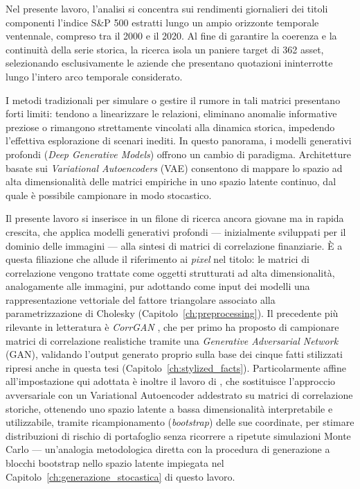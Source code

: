 Nel presente lavoro, l'analisi si concentra sui rendimenti giornalieri dei titoli componenti l'indice S\&P 500 estratti lungo un ampio orizzonte temporale ventennale, compreso tra il 2000 e il 2020. Al fine di garantire la coerenza e la continuità della serie storica, la ricerca isola un paniere target di 362 asset, selezionando esclusivamente le aziende che presentano quotazioni ininterrotte lungo l'intero arco temporale considerato.

I metodi tradizionali per simulare o gestire il rumore in tali matrici presentano forti limiti: tendono a linearizzare le relazioni, eliminano anomalie informative preziose o rimangono strettamente vincolati alla dinamica storica, impedendo l'effettiva esplorazione di scenari inediti. In questo panorama, i modelli generativi profondi (\emph{Deep Generative Models}) offrono un cambio di paradigma. Architetture basate sui \emph{Variational Autoencoders} (VAE) \citep{kingma2013vae} consentono di mappare lo spazio ad alta dimensionalità delle matrici empiriche in uno spazio latente continuo, dal quale è possibile campionare in modo stocastico.

Il presente lavoro si inserisce in un filone di ricerca ancora giovane ma in rapida crescita, che applica modelli generativi profondi --- inizialmente sviluppati per il dominio delle immagini --- alla sintesi di matrici di correlazione finanziarie. È a questa filiazione che allude il riferimento ai \emph{pixel} nel titolo: le matrici di correlazione vengono trattate come oggetti strutturati ad alta dimensionalità, analogamente alle immagini, pur adottando come input dei modelli una rappresentazione vettoriale del fattore triangolare associato alla parametrizzazione di Cholesky (Capitolo~\ref{ch:preprocessing}). Il precedente più rilevante in letteratura è \emph{CorrGAN} \citep{marti2019corrgan}, che per primo ha proposto di campionare matrici di correlazione realistiche tramite una \emph{Generative Adversarial Network} (GAN), validando l'output generato proprio sulla base dei cinque fatti stilizzati ripresi anche in questa tesi (Capitolo~\ref{ch:stylized_facts}). Particolarmente affine all'impostazione qui adottata è inoltre il lavoro di \citet{caprioli2024ptfvae}, che sostituisce l'approccio avversariale con un Variational Autoencoder addestrato su matrici di correlazione storiche, ottenendo uno spazio latente a bassa dimensionalità interpretabile e utilizzabile, tramite ricampionamento (\emph{bootstrap}) delle sue coordinate, per stimare distribuzioni di rischio di portafoglio senza ricorrere a ripetute simulazioni Monte Carlo --- un'analogia metodologica diretta con la procedura di generazione a blocchi bootstrap nello spazio latente impiegata nel Capitolo~\ref{ch:generazione_stocastica} di questo lavoro.

